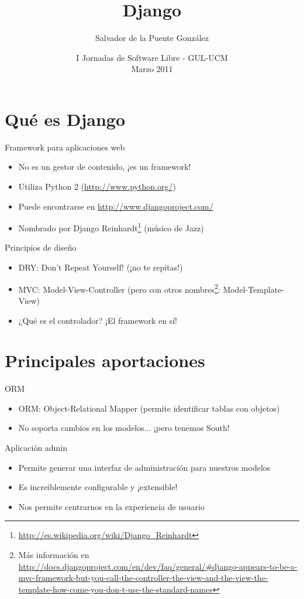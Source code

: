 \documentclass[spanish]{beamer}
\title[Django - GUL-UCM]
{Django
}
\author[\url{http://gulucm.org}]
{Salvador de la Puente González}
\institute{Facultad de Informática.\\Universidad Complutense de Madrid.}
\date{
I Jornadas de Software Libre - GUL-UCM\\
Marzo 2011}
\begin{document}
\frame{\titlepage}

\section{Qué es Django}
\begin{frame}{Framework para aplicaciones web}
\begin{itemize}
\item No es un gestor de contenido, ¡es un framework!
\item Utiliza Python 2 (\url{http://www.python.org/})
\item Puede encontrarse en \url{http://www.djangoproject.com/}
\item Nombrado por Django Reinhardt\footnote{\url{http://es.wikipedia.org/wiki/Django\_Reinhardt}} (músico de Jazz) 
\end{itemize}
\end{frame}

\begin{frame}{Principios de diseño}
\begin{itemize}
\item DRY: Don't Repeat Yourself! (¡no te repitas!)
\item MVC: Model-View-Controller (pero con otros nombres\footnote{Más información en \url{http://docs.djangoproject.com/en/dev/faq/general/#django-appears-to-be-a-mvc-framework-but-you-call-the-controller-the-view-and-the-view-the-template-how-come-you-don-t-use-the-standard-names}}: Model-Template-View)
\item ¿Qué es el controlador? ¡El framework en sí!
\end{itemize}
\end{frame}

\section{Principales aportaciones}
\begin{frame}{ORM}
\begin{itemize}
\item ORM: Object-Relational Mapper (permite identificar tablas con objetos)
\item No soporta cambios en los modelos... ¡pero tenemos South!
\end{itemize}
\end{frame}

\begin{frame}{Aplicación admin}
\begin{itemize}
\item Permite generar una interfaz de administración para nuestros modelos
\item Es increiblemente configurable y ¡extensible!
\item Nos permite centrarnos en la experiencia de usuario
\end{itemize}
\end{frame}
\end{document}
